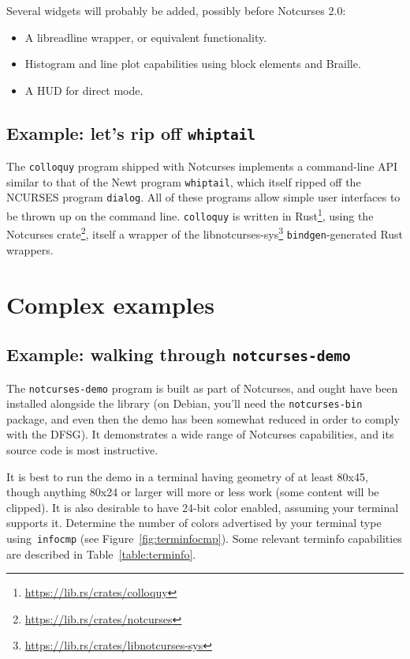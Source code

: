 \documentclass[letterpaper,10pt]{article}
\newenvironment{denseitemize}{
  \begin{itemize}
      \setlength{\itemsep}{0pt}
}{
  \end{itemize}
}
\begin{document}
Several widgets will probably be added, possibly before Notcurses 2.0:
\begin{denseitemize}
\item{A libreadline wrapper, or equivalent functionality.}
\item{Histogram and line plot capabilities using block elements and Braille.}
\item{A HUD for direct mode.}
\end{denseitemize}

\subsection{Example: let's rip off \texttt{whiptail}}
The \texttt{colloquy} program shipped with Notcurses implements a command-line
API similar to that of the Newt program \texttt{whiptail}, which itself ripped
off the NCURSES program \texttt{dialog}. All of these programs allow simple
user interfaces to be thrown up on the command line. \texttt{colloquy} is
written in Rust\footnote{\url{https://lib.rs/crates/colloquy}}, using the
Notcurses crate\footnote{\url{https://lib.rs/crates/notcurses}}, itself a wrapper
of the libnotcurses-sys\footnote{\url{https://lib.rs/crates/libnotcurses-sys}}
\texttt{bindgen}-generated Rust wrappers.

\section{Complex examples}
\subsection{Example: walking through \texttt{notcurses-demo}}
\label{sec:ncdemo}
The \texttt{notcurses-demo} program is built as part of Notcurses, and ought
have been installed alongside the library (on Debian, you'll need the
\texttt{notcurses-bin} package, and even then the demo has been somewhat
reduced in order to comply with the DFSG\cite{dfsg}). It demonstrates a wide
range of Notcurses capabilities, and its source code is most instructive.

It is best to run the demo in a terminal having geometry of at least 80x45,
though anything 80x24 or larger will more or less work (some content will be
clipped). It is also desirable to have 24-bit color enabled, assuming your
terminal supports it. Determine the number of colors advertised by your
terminal type using~\texttt{infocmp} (see Figure~\ref{fig:terminfocmp}).
Some relevant terminfo capabilities are described in Table~\ref{table:terminfo}.
\end{document}
